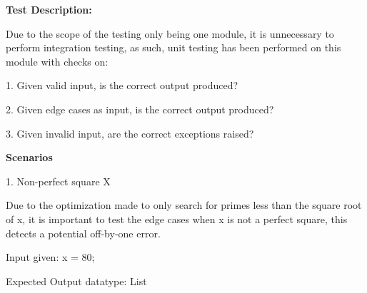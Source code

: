 \documentclass[12pt]{article}
\begin{document}
\begin{justify}
\textbf{Test Description:}
\end{justify}\par

\begin{justify}
Due to the scope of the testing only being one module, it is unnecessary to perform integration testing, as such, unit testing has been performed on this module with checks on:
\end{justify}\par

\begin{justify}
1. Given valid input, is the correct output produced?
\end{justify}\par

\begin{justify}
2. Given edge cases as input, is the correct output produced?
\end{justify}\par

\begin{justify}
3. Given invalid input, are the correct exceptions raised?
\end{justify}\par


\vspace{\baselineskip}
\begin{justify}
\textbf{Scenarios}
\end{justify}\par

\begin{justify}
1. Non-perfect square X
\end{justify}\par

\begin{justify}
Due to the optimization made to only search for primes less than the square root of x, it is important to test the edge cases when x is not a perfect square, this detects a potential off-by-one error.
\end{justify}\par

\begin{justify}
Input given: x = 80;
\end{justify}\par

\begin{justify}
Expected Output datatype: List
\end{justify}\par
\end{document}
